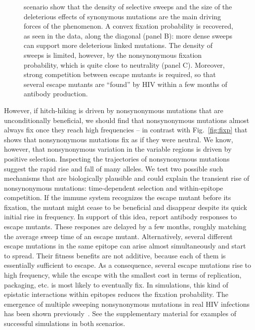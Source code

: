 \documentclass[rmp, twocolumn]{revtex4}
\newcommand{\FIG}[1]{Fig.~\ref{fig:#1}}
\begin{document}
\begin{figure}
\begin{center}
{ scenario show that the density of selective sweeps and the size of the
 deleterious effects of synonymous mutations are the main driving forces of the
 phenomenon. A convex fixation probability is recovered, as seen in the data,
 along the diagonal (panel B): more dense sweeps can support more deleterious
 linked mutations. The density of sweeps is limited, however, by the
 nonsynonymous fixation probability, which is quite close to neutrality (panel
 C). Moreover, strong competition between escape mutants is required, so that
 several escape mutants are ``found'' by HIV within a few months of antibody
production.}
\label{fig:simheat}
\end{center}
\end{figure}


However, if hitch-hiking is driven by nonsynonymous mutations that are
unconditionally beneficial, we should find that nonsynonymous mutations almost
always fix once they reach high frequencies -- in contrast with \FIG{fixp} that
shows that nonsynonymous mutations fix as if they were neutral. We know,
however, that nonsynonymous variation in the variable regions is driven by
positive selection. Inspecting the trajectories of nonsynonymous mutations
suggest the rapid rise and fall of many alleles.  We test two possible such
mechanisms that are biologically plausible and could explain the transient rise
of nonsynonymous mutations: time-dependent selection and within-epitope
competition. If the immune system recognizes the escape mutant before its
fixation, the mutant might cease to be beneficial and disappear despite its
quick initial rise in frequency.  In support of this idea,
\citet{richman_rapid_2003, bunnik_autologous_2008} report antibody responses to
escape mutants. These respones are delayed by a few months, roughly matching the
average sweep time of an escape mutant. Alternatively, several different escape
mutations in the same epitope can arise almost simultaneously and start to
spread. Their fitness benefits are not additive, because each of them is
essentially sufficient to escape. As a consequence, several escape mutations rise to
high frequency, while the escape with the smallest cost in terms of replication,
packaging, etc. is most likely to
eventually fix. In simulations, this kind of epistatic interactions within
epitopes reduces the fixation probability. The emergence of
multiple sweeping nonsynonymous mutations in real HIV infections has been shown
previously~\citep{moore_limited_2009, bar_early_2012}.
See the supplementary material for examples of successful simulations in both scenarios.
\end{document}
